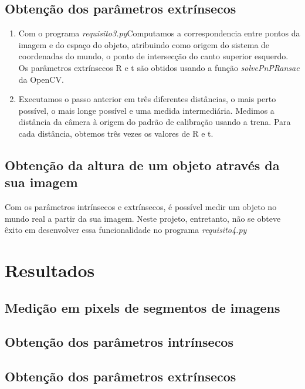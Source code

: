 \documentclass[conference]{IEEEtran}
\begin{document}
\subsection{Obtenção dos parâmetros extrínsecos}
\begin{enumerate}
\item Com o programa \textit{requisito3.py}Computamos a correspondencia entre pontos da imagem e do espaço do objeto, atribuindo como origem do sistema de coordenadas do mundo, o ponto de intersecção do canto superior esquerdo. Os parâmetros extrínsecos R e t são obtidos usando a função \textit{solvePnPRansac} da OpenCV.
\item Executamos o passo anterior em três diferentes distâncias, o mais perto possível, o mais longe possível e uma medida intermediária. Medimos a distância da câmera à origem do padrão de calibração usando a trena. Para cada distância, obtemos três vezes os valores de R e t.
\end{enumerate}
\subsection{Obtenção da altura de um objeto através da sua imagem}
Com os parâmetros intrínsecos e extrínsecos,  é possível medir um objeto no mundo real a partir da sua imagem. Neste projeto, entretanto, não se obteve êxito em desenvolver essa funcionalidade no programa \textit{requisito4.py}

\section{Resultados}
\subsection{Medição em pixels de segmentos de imagens}
\subsection{Obtenção dos parâmetros intrínsecos}
\subsection{Obtenção dos parâmetros extrínsecos}
\end{document}
